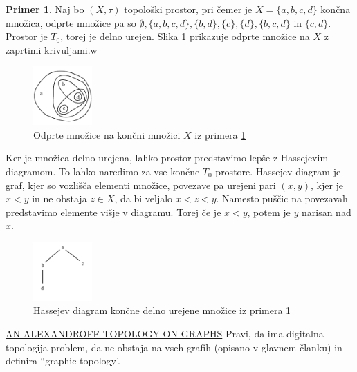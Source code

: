 \documentclass[a4paper, 12pt]{book}
\theoremstyle{definition}
\newtheorem{example}{Primer}[section]
\begin{document}
\begin{example}\label{ex1}
    Naj bo $(X,\tau)$ topološki prostor, pri čemer je $X = \{a,b,c,d\}$ končna
    množica, odprte množice pa so $\emptyset, \{a,b,c,d\}, \{b,d\}, \{c\}, \{d\},
    \{b,c,d\}$ in $\{c,d\}$. Prostor je $T_0$, torej je delno urejen. Slika \ref{pic1}
    prikazuje odprte množice na $X$ z zaprtimi krivuljami.w
    \begin{figure}[h]
        \begin{center}
        \includegraphics[width=0.2\textwidth]{example-topology.pdf}
        \end{center}
        \caption{Odprte množice na končni množici $X$ iz primera \ref{ex1}}
        \label{pic1}
    \end{figure}
    Ker je množica delno urejena, lahko prostor predstavimo lepše z Hassejevim diagramom.
    To lahko naredimo za vse končne $T_0$ prostore. Hassejev diagram je graf,
    kjer so vozlišča elementi množice, povezave pa urejeni pari $(x,y)$, kjer je $x < y$ in
    ne obstaja $z \in X$, da bi veljalo $x < z < y$. Namesto puščic na povezavah
    predstavimo elemente višje v diagramu. Torej če je $x < y$, potem je $y$
    narisan nad $x$.

    \begin{figure}[h]
        \begin{center}
        \includegraphics[width=0.2\textwidth]{hasse-example.pdf}
        \end{center}
        \caption{Hassejev diagram končne delno urejene množice iz primera \ref{ex1}}
        \label{pic2}
    \end{figure}
\end{example}



\href{http://bims.iranjournals.ir/article_266_e1ff26c6f7b350afcde8bd3ec3654132.pdf}{AN ALEXANDROFF TOPOLOGY ON GRAPHS}
Pravi, da ima digitalna\\ topologija problem, da ne obstaja na vseh grafih
(opisano v glavnem članku) in definira ``graphic topology'.
\end{document}
